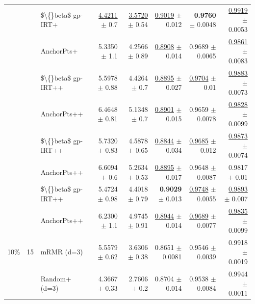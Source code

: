 \begin{longtable}{llp{}rrrrr}
 &  & \$\textbackslash\{\}beta\$ gp-IRT+ & \underline{4.4211} {\scriptsize $\pm$ 0.7} & \underline{3.5720} {\scriptsize $\pm$ 0.54} & \underline{0.9019} {\scriptsize $\pm$ 0.012} & \textbf{0.9760} {\scriptsize $\pm$ 0.0048} & \underline{0.9919} {\scriptsize $\pm$ 0.0053} \\
 &  & AnchorPts+ & 5.3350 {\scriptsize $\pm$ 1.1} & 4.2566 {\scriptsize $\pm$ 0.89} & \underline{0.8908} {\scriptsize $\pm$ 0.014} & 0.9689 {\scriptsize $\pm$ 0.0065} & \underline{0.9861} {\scriptsize $\pm$ 0.0083} \\
 &  & \$\textbackslash\{\}beta\$ gp-IRT++ & 5.5978 {\scriptsize $\pm$ 0.88} & 4.4264 {\scriptsize $\pm$ 0.7} & \underline{0.8895} {\scriptsize $\pm$ 0.027} & \underline{0.9704} {\scriptsize $\pm$ 0.01} & \underline{0.9883} {\scriptsize $\pm$ 0.0073} \\
 &  & AnchorPts++ & 6.4648 {\scriptsize $\pm$ 0.81} & 5.1348 {\scriptsize $\pm$ 0.7} & \underline{0.8901} {\scriptsize $\pm$ 0.015} & 0.9659 {\scriptsize $\pm$ 0.0078} & \underline{0.9828} {\scriptsize $\pm$ 0.0099} \\
 &  & \$\textbackslash\{\}beta\$ gp-IRT++ & 5.7320 {\scriptsize $\pm$ 0.83} & 4.5878 {\scriptsize $\pm$ 0.65} & \underline{0.8844} {\scriptsize $\pm$ 0.034} & \underline{0.9685} {\scriptsize $\pm$ 0.012} & \underline{0.9873} {\scriptsize $\pm$ 0.0074} \\
 &  & AnchorPts++ & 6.6094 {\scriptsize $\pm$ 0.6} & 5.2634 {\scriptsize $\pm$ 0.53} & \underline{0.8895} {\scriptsize $\pm$ 0.017} & 0.9648 {\scriptsize $\pm$ 0.0087} & 0.9817 {\scriptsize $\pm$ 0.01} \\
 &  & \$\textbackslash\{\}beta\$ gp-IRT++ & 5.4724 {\scriptsize $\pm$ 0.98} & 4.4018 {\scriptsize $\pm$ 0.79} & \textbf{0.9029} {\scriptsize $\pm$ 0.013} & \underline{0.9748} {\scriptsize $\pm$ 0.0055} & \underline{0.9893} {\scriptsize $\pm$ 0.007} \\
 &  & AnchorPts++ & 6.2300 {\scriptsize $\pm$ 1.1} & 4.9745 {\scriptsize $\pm$ 0.91} & \underline{0.8944} {\scriptsize $\pm$ 0.014} & \underline{0.9689} {\scriptsize $\pm$ 0.0077} & \underline{0.9835} {\scriptsize $\pm$ 0.0099} \\
\midrule
10\% & 15 & mRMR (d=3) & 5.5579 {\scriptsize $\pm$ 0.62} & 3.6306 {\scriptsize $\pm$ 0.38} & 0.8651 {\scriptsize $\pm$ 0.0081} & 0.9546 {\scriptsize $\pm$ 0.0039} & 0.9918 {\scriptsize $\pm$ 0.0019} \\
 &  & Random+ (d=3) & 4.3667 {\scriptsize $\pm$ 0.33} & 2.7606 {\scriptsize $\pm$ 0.2} & 0.8704 {\scriptsize $\pm$ 0.014} & 0.9538 {\scriptsize $\pm$ 0.0084} & 0.9944 {\scriptsize $\pm$ 0.0011} \\

\end{longtable}
